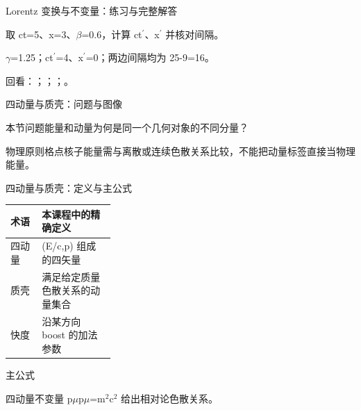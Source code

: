 \begin{frame}[t]{Lorentz 变换与不变量：练习与完整解答}
\footnotesize
\begin{block}{}取 ct=5、x=3、\ensuremath{\beta}=0.6，计算 ct\ensuremath{^{\prime}}、x\ensuremath{^{\prime}} 并核对间隔。\end{block}
\begin{exampleblock}{}\ensuremath{\gamma}=1.25；ct\ensuremath{^{\prime}}=4、x\ensuremath{^{\prime}}=0；两边间隔均为 25-9=16。\end{exampleblock}
\vfill
\scriptsize 回看：；；；。
\end{frame}

\begin{frame}[t]{四动量与质壳：问题与图像}
\footnotesize
\begin{block}{本节问题}能量和动量为何是同一个几何对象的不同分量？\end{block}
\begin{block}{物理原则}\quad 格点核子能量需与离散或连续色散关系比较，不能把动量标签直接当物理能量。\end{block}
\end{frame}

\begin{frame}[t]{四动量与质壳：定义与主公式}
\footnotesize\begin{tabularx}{\linewidth}{p{0.30\linewidth}Y}
\toprule 术语 & 本课程中的精确定义\\\midrule
{} 四动量 & (E/\allowbreak{}c,p) 组成的四矢量\\
 质壳 & 满足给定质量色散关系的动量集合\\
 快度 & 沿某方向 boost 的加法参数\\
\bottomrule\end{tabularx}\vspace{0.15cm}
\begin{block}{ 主公式}\centering{}\end{block}
四动量不变量 p\ensuremath{\mu}p\ensuremath{\mu}=m\ensuremath{^{2}}c\ensuremath{^{2}} 给出相对论色散关系。
\end{frame}

